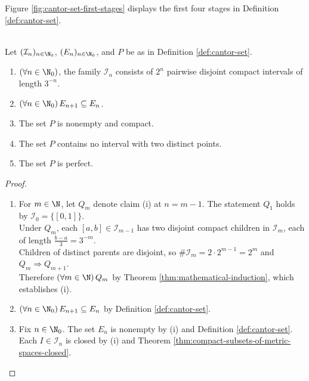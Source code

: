 Figure \ref{fig:cantor-set-first-stages} displays the first four stages in Definition \ref{def:cantor-set}.
\begin{illustrationfigure}[H]
  \centering
  
  \caption{The retained intervals shrink from $E_0$ through $E_3$, while the middle-third gaps persist.}
  \label{fig:cantor-set-first-stages}
\end{illustrationfigure}

\begin{proposition} \label{prop:cantor-set-basic-topological-properties} \\
Let $(\mathcal{I}_n)_{n\in\N_0}$, $(E_n)_{n\in\N_0}$, and $P$ be as in Definition \ref{def:cantor-set}.
\begin{enumerate}[label=(\roman*)]
\setlength{\itemsep}{0pt}
\item $(\forall n\in\N_0)$, the family $\mathcal{I}_n$ consists of $2^n$ pairwise disjoint compact intervals of length $3^{-n}$.
\item $(\forall n\in\N_0)\,E_{n+1}\subseteq E_n$.
\item The set $P$ is nonempty and compact.
\item The set $P$ contains no interval with two distinct points.
\item The set $P$ is perfect.
\end{enumerate}
\begin{proof}
\begin{enumerate}[label=(\roman*)]
\setlength{\itemsep}{0pt}
\item For $m\in\N$, let $Q_m$ denote claim (i) at $n=m-1$. The statement $Q_1$ holds by $\mathcal{I}_0=\{[0,1]\}$.\\
Under $Q_m$, each $[a,b]\in\mathcal{I}_{m-1}$ has two disjoint compact children in $\mathcal{I}_m$, each of length $\frac{b-a}{3}=3^{-m}$.\\
Children of distinct parents are disjoint, so $\#\mathcal{I}_m=2\cdot2^{m-1}=2^m$ and $Q_m\Rightarrow Q_{m+1}$.\\
Therefore $(\forall m\in\N)\,Q_m$ by Theorem \ref{thm:mathematical-induction}, which establishes (i).
\item $(\forall n\in\N_0)\,E_{n+1}\subseteq E_n$ by Definition \ref{def:cantor-set}.
\item Fix $n\in\N_0$. The set $E_n$ is nonempty by (i) and Definition \ref{def:cantor-set}. Each $I\in\mathcal{I}_n$ is closed by (i) and Theorem \ref{thm:compact-subsets-of-metric-spaces-closed}.\\

\end{enumerate}
\end{proof}
\end{proposition}
